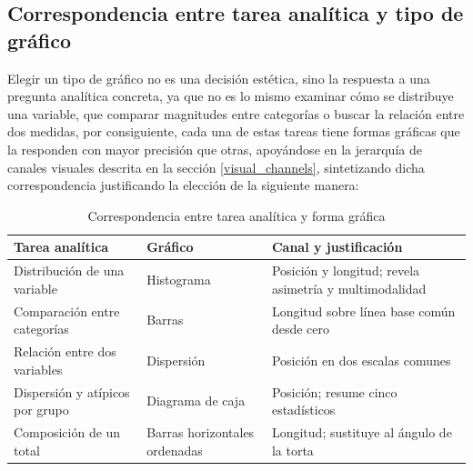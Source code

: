     \subsection{Correspondencia entre tarea analítica y tipo de gráfico}
    \label{task_chart_correspondence}
        Elegir un tipo de gráfico no es una decisión estética, sino la respuesta a una
        pregunta analítica concreta, ya que no es lo mismo examinar cómo se distribuye
        una variable, que comparar magnitudes entre categorías o buscar la relación
        entre dos medidas, por consiguiente, cada una de estas tareas tiene formas
        gráficas que la responden con mayor precisión que otras, apoyándose en la
        jerarquía de canales visuales descrita en la sección \ref{visual_channels},
        sintetizando dicha correspondencia justificando la elección de la siguiente
        manera:

        \begin{table}[H]
            \centering
            \caption{Correspondencia entre tarea analítica y forma gráfica}
            \begin{center}
                \footnotesize
                \begin{tabular}{|>{\raggedright\arraybackslash}p{1.9cm}|>{\raggedright\arraybackslash}p{1.7cm}|>{\raggedright\arraybackslash}p{2.9cm}|}
                    \hline
                    \textbf{Tarea analítica} & \textbf{Gráfico} & \textbf{Canal y justificación} \\
                    \hline
                    Distribución de una variable & Histograma & Posición y longitud; revela asimetría y multimodalidad \\
                    \hline
                    Comparación entre categorías & Barras & Longitud sobre línea base común desde cero \\
                    \hline
                    Relación entre dos variables & Dispersión & Posición en dos escalas comunes \\
                    \hline
                    Dispersión y atípicos por grupo & Diagrama de caja & Posición; resume cinco estadísticos \\
                    \hline
                    Composición de un total & Barras horizontales ordenadas & Longitud; sustituye al ángulo de la torta \\
                    \hline
                \end{tabular}
                \label{task_chart_mapping}
            \end{center}
        \end{table}